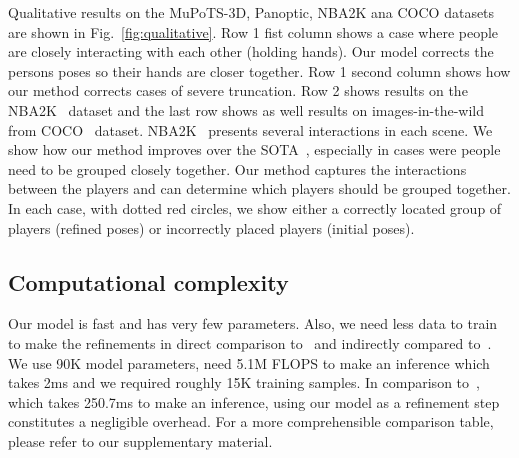 Qualitative results on the MuPoTS-3D, Panoptic, NBA2K ana COCO datasets are shown in Fig.~\ref{fig:qualitative}. Row 1 fist column shows a case where people are closely interacting with each other (holding hands). Our model corrects the persons poses so their hands are closer together. Row 1 second column shows how our method corrects cases of severe truncation. Row 2 shows results on the NBA2K~\cite{zhu_2020_eccv_nba} dataset and the last row shows as well results on images-in-the-wild from COCO~\cite{coco} dataset. NBA2K~\cite{zhu_2020_eccv_nba} 
presents several interactions in each scene. We show how our method improves over the SOTA~\cite{Moon_2019_ICCV_3DMPPE}, especially in cases were people need to be grouped closely together. Our method captures the interactions between the players and can determine which players should be grouped together. In each case, with dotted red circles, we show either a correctly located group of players (refined poses) or incorrectly placed players (initial poses).



\subsection{Computational complexity}
\label{sec:complexity}
Our model is fast and has very few parameters. Also, we need less data to train to make the refinements in direct comparison to~\cite{guo2021pi} and indirectly compared to~\cite{Moon_2019_ICCV_3DMPPE,HMOR2020,smap_eccv2020}. We use 90K model parameters, need 5.1M FLOPS to make an inference which takes 2ms and we required roughly 15K training samples. In comparison to~\cite{Moon_2019_ICCV_3DMPPE}, which takes 250.7ms to make an inference, using our model as a refinement step constitutes a negligible overhead. For a more comprehensible comparison table, please refer to our supplementary material.







%
